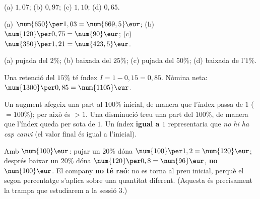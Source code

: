\begin{solucions}
\begin{sollist}
  \item (a) $1,07$; \quad (b) $0,97$; \quad (c) $1,10$; \quad (d) $0,65$.
  \item (a) $\num{650}\per 1,03=\num{669,5}\eur$; \quad
        (b) $\num{120}\per 0,75=\num{90}\eur$; \quad
        (c) $\num{350}\per 1,21=\num{423,5}\eur$.
  \item (a) pujada del $2\%$; \quad (b) baixada del $25\%$; \quad (c) pujada del $50\%$;
        \quad (d) baixada de l'$1\%$.
  \item Una retenció del $15\%$ té índex $I=1-0,15=0,85$. Nòmina neta:
        $\num{1300}\per 0,85=\num{1105}\eur$.
  \item Un augment afegeix una part al $100\%$ inicial, de manera que l'índex passa de
        $1$ ($=100\%$); per això és $>1$. Una disminució treu una part del $100\%$, de
        manera que l'índex queda per sota de $1$. Un índex \textbf{igual a $1$}
        representaria que \emph{no hi ha cap canvi} (el valor final és igual a
        l'inicial).
  \item Amb $\num{100}\eur$: pujar un $20\%$ dóna $\num{100}\per 1,2=\num{120}\eur$;
        després baixar un $20\%$ dóna $\num{120}\per 0,8=\num{96}\eur$, \textbf{no}
        $\num{100}\eur$. El company \textbf{no té raó}: no es torna al preu inicial,
        perquè el segon percentatge s'aplica sobre una quantitat diferent. (Aquesta és
        precisament la trampa que estudiarem a la sessió 3.)
\end{sollist}
\end{solucions}
